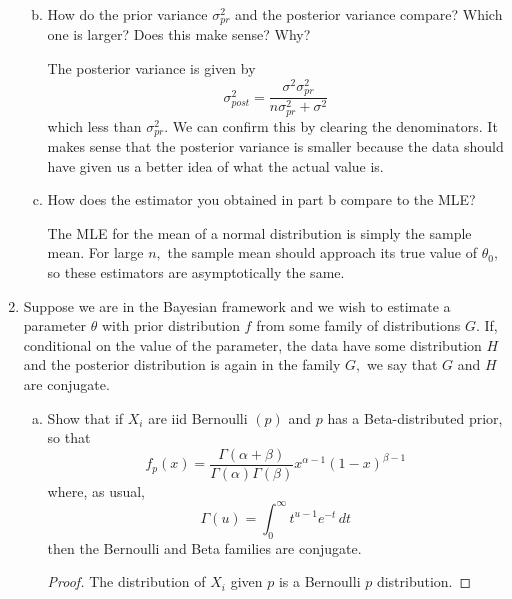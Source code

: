 \documentclass{article}
\begin{document}
\begin{enumerate}
\begin{enumerate}[(a)]
\begin{soln}
				\end{soln}

			\item How do the prior variance $\sigma_{pr}^2$ and the posterior variance compare? Which one is larger? Does this make sense? Why?
				\begin{soln}
					The posterior variance is given by \[\sigma_{post}^2 = \frac{\sigma^2\sigma_{pr}^2}{n\sigma_{pr}^2+\sigma^2}\] which less than $\sigma_{pr}^2.$ We can confirm this by clearing the denominators. It makes sense that the posterior variance is smaller because the data should have given us a better idea of what the actual value is.
					
				\end{soln}

			\item How does the estimator you obtained in part b compare to the MLE?
				\begin{soln}
					The MLE for the mean of a normal distribution is simply the sample mean. For large $n,$ the sample mean should approach its true value of $\theta_0,$ so these estimators are asymptotically the same.
					
				\end{soln}
				
		\end{enumerate}

	\item Suppose we are in the Bayesian framework and we wish to estimate a parameter $\theta$ with prior distribution $f$ from some family of distributions $G.$ If, conditional on the value of the parameter, the data have some distribution $H$ and the posterior distribution is again in the family $G,$ we say that $G$ and $H$ are conjugate.

		\begin{enumerate}[(a)]
			\item Show that if $X_i$ are iid Bernoulli $(p)$ and $p$ has a Beta-distributed prior, so that \[f_p(x)=\frac{\Gamma(\alpha+\beta)}{\Gamma(\alpha)\Gamma(\beta)}x^{\alpha-1}(1-x)^{\beta-1}\] where, as usual, \[\Gamma(u)=\int_0^\infty t^{u-1}e^{-t}\, dt\] then the Bernoulli and Beta families are conjugate.
				\begin{proof}
					The distribution of $X_i$ given $p$ is a Bernoulli $p$ distribution.


\end{proof}
\end{enumerate}
\end{enumerate}
\end{document}
